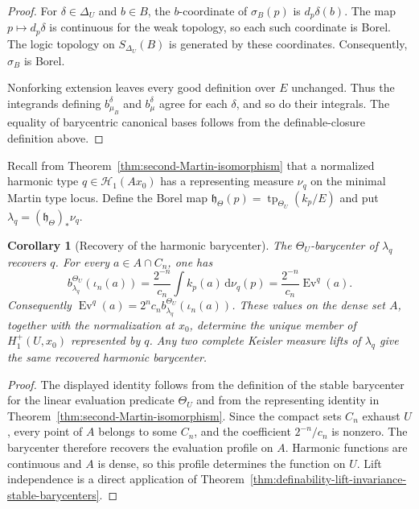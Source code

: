 \documentclass{amsart}
\newtheorem{corollary}[theorem]{Corollary}
\theoremstyle{definition}
\theoremstyle{remark}
\numberwithin{equation}{section}
\begin{document}
\begin{proof}
For $\delta\in\Delta_U$ and $b\in B$, the $b$-coordinate of
$\sigma_B(p)$ is $d_p\delta(b)$. The map
$p\mapsto d_p\delta$ is continuous for the weak topology, so each
such coordinate is Borel. The logic topology on
$S_{\Delta_U}(B)$ is generated by these coordinates. Consequently, $\sigma_B$ is Borel.

Nonforking extension leaves every good definition over $E$
unchanged. Thus the integrands defining $b_{\mu_B}^\delta$ and
$b_\mu^\delta$ agree for each $\delta$, and so do their integrals.
The equality of barycentric canonical bases follows from the
definable-closure definition above.
\end{proof}

Recall from Theorem~\ref{thm:second-Martin-isomorphism} that a
normalized harmonic type $q\in\mathscr H_1(Ax_0)$ has a representing
measure $\nu_q$ on the minimal Martin type locus. Define the Borel map
$\mathfrak h_\Theta(p)=\operatorname{tp}_{\Theta_U}(k_p/E)$ and put
$\lambda_q=(\mathfrak h_\Theta)_*\nu_q$.

\begin{corollary}[Recovery of the harmonic barycenter]
\label{cor:harmonic-barycenter-recovery}
The $\Theta_U$-barycenter of $\lambda_q$ recovers $q$. For every
$a\in A\cap C_n$, one has
$$
b_{\lambda_q}^{\Theta_U}(\iota_n(a))
=\frac{2^{-n}}{c_n}\int k_p(a)\,\mathrm{d}\nu_q(p)
=\frac{2^{-n}}{c_n}\operatorname{Ev}^q(a).
$$
Consequently
$\operatorname{Ev}^q(a)=2^nc_n
b_{\lambda_q}^{\Theta_U}(\iota_n(a))$. These values on the dense set
$A$, together with the normalization at $x_0$, determine the unique
member of $H_1^+(U,x_0)$ represented by $q$. Any two complete
Keisler measure lifts of $\lambda_q$ give the same recovered
harmonic barycenter.
\end{corollary}

\begin{proof}
The displayed identity follows from the definition of the stable
barycenter for the linear evaluation predicate $\Theta_U$ and from
the representing identity in
Theorem~\ref{thm:second-Martin-isomorphism}. Since the compact sets
$C_n$ exhaust $U$, every point of $A$ belongs to some $C_n$, and the
coefficient $2^{-n}/c_n$ is nonzero. The barycenter therefore
recovers the evaluation profile on $A$. Harmonic functions are
continuous and $A$ is dense, so this profile determines the function
on $U$. Lift independence is a direct application of
Theorem~\ref{thm:definability-lift-invariance-stable-barycenters}.
\end{proof}
\end{document}
